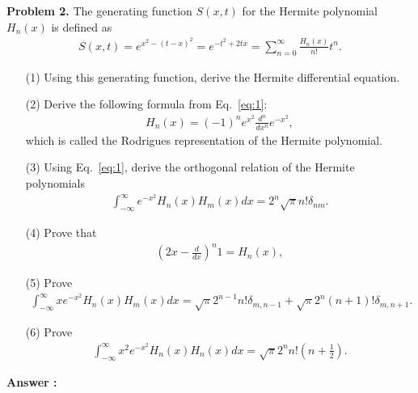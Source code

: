 \documentclass[floatfix,nofootinbib,superscriptaddress,fleqn]{revtex4-2}
\begin{document}
\vspace{0.5cm}
\newpage
\noindent \textbf{Problem 2.} 
The generating function $S(x,t)$ for the Hermite polynomial $H_n(x)$
is defined as 
\begin{align}
S(x,t) = e^{x^2-(t-x)^2} = e^{-t^2 + 2 t x} 
= \sum_{n=0}^\infty
  \frac{H_n(x)}{n!} t^n.  
\label{eq:1}
\end{align}
\begin{itemize}
\item[(1)] Using this generating function, derive the Hermite
  differential equation. 
\item[(2)] Derive the following formula from Eq.~\eqref{eq:1}:
  \begin{align}
H_n(x) = (-1)^n e^{x^2} \frac{d^n}{dx^n} e^{-x^2}    ,
  \end{align}
which is called the Rodrigues representation of the Hermite
polynomial. 
\item[(3)] Using Eq.~\eqref{eq:1}, derive the orthogonal relation of
  the Hermite polynomials
  \begin{align}
    \int_{-\infty}^\infty e^{-x^2} H_n(x) H_m(x) dx 
    = 2^n \sqrt{\pi}
    n! \delta_{nm}.
  \end{align}
\item[(4)] Prove that
  \begin{align}
    \left(2x-\frac{d}{dx}\right)^n 1 = H_n(x),
  \end{align}
\item[(5)] Prove
  \begin{align}
    \int_{-\infty}^\infty x e^{-x^2} H_n(x) H_m(x) dx 
    = \sqrt{\pi}
    2^{n-1} n!\delta_{m,n-1} 
    + \sqrt{\pi} 2^n (n+1)! \delta_{m,n+1}.
  \end{align}
\item[(6)] Prove
  \begin{align}\label{eq:2}
    \int_{-\infty}^\infty x^2 e^{-x^2} H_n(x) H_n(x) dx = 
\sqrt{\pi} 2^n n! \left(n+\frac12\right).
  \end{align}
\end{itemize}

\noindent \textbf{Answer : }
\end{document}
